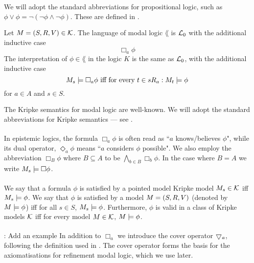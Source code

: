 We will adopt the standard abbreviations for propositional logic, such as $\phi \lor \phi =
\neg(\neg \phi \land \neg \phi)$.
These are defined in \cite{blackburn2002modal}.

\begin{defn} \label{modalLogic}
Let $M = (S, R, V) \in \mathcal{K}$.
The language of modal logic $\lang$ is $\mathcal{L}_0$ with the additional inductive case
\[
	 \Box_a \phi
\]
The interpretation of $\phi \in \lang$ in the logic $K$ is the same as $\mathcal{L}_0$, with the
additional inductive case
\[
	M_s \models \Box_a \phi \text{ iff for every }t \in s R_a: M_t \models \phi
\]
for $a \in A$ and $s \in S$.
\end{defn}
The Kripke semantics for modal logic are well-known.
We will adopt the standard abbreviations for Kripke semantics --- see \cite{blackburn2002modal}.\\
\\
In epistemic logics, the formula $\Box_a \phi$ is often read as ``$a$ knows/believes $\phi$", while
its dual operator, $\Diamond_a \phi$ means ``$a$ considers $\phi$ possible".
We also employ the abbreviation $\Box_B \phi$ where $B \subseteq A$ to be $\bigwedge_{b \in B}
\Box_b \phi$.
In the case where $B = A$ we write $M_s \models \Box \phi$.\\
\\
We say that a formula $\phi$ is satisfied by a pointed model Kripke model $M_s \in \mathcal{K}$ iff
$M_s \models \phi$.
We say that $\phi$ is satisfied by a model $M = (S, R, V)$ (denoted by
    $M \models \phi$) iff
for all $s \in S$, $M_s \models \phi$.
Furthermore, $\phi$ is valid in a class of Kripke models $\mathcal{K}$ iff for
every model $M \in
\mathcal{K}$, $M \models \phi$.\\
\\
\FIXME: Add an example
In addition to $\Box_a$ we introduce the cover operator $\bigtriangledown_a$, following the definition used in
\cite{venemaproofsystems}.
The cover operator forms the basis for the axiomatisations for refinement modal logic, which we use
later.

